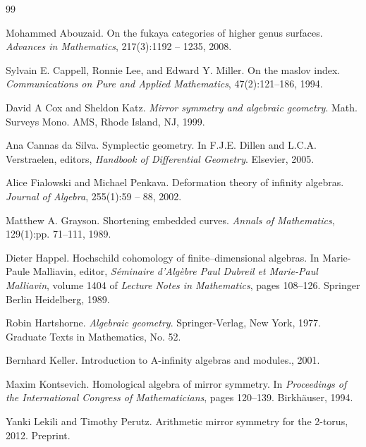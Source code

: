 
\begin{thebibliography}{99}

 Mohammed Abouzaid. On the fukaya categories of higher genus surfaces. \emph{Advances in Mathematics}, 217(3):1192 -- 1235, 2008.

 Sylvain E. Cappell, Ronnie Lee, and Edward Y. Miller. On the maslov index. \emph{Communications on Pure and Applied Mathematics}, 47(2):121--186, 1994.

 David A Cox and Sheldon Katz. \emph{Mirror symmetry and algebraic geometry}. Math. Surveys Mono. AMS, Rhode Island, NJ, 1999.

 Ana Cannas da Silva. Symplectic geometry. In F.J.E. Dillen and L.C.A. Verstraelen, editors, \emph{Handbook of Differential Geometry}. Elsevier, 2005.

 Alice Fialowski and Michael Penkava. Deformation theory of infinity algebras. \emph{Journal of Algebra}, 255(1):59 -- 88, 2002.

 Matthew A. Grayson. Shortening embedded curves. \emph{Annals of Mathematics}, 129(1):pp. 71--111, 1989.

 Dieter Happel. Hochschild cohomology of finite--dimensional algebras. In Marie-Paule Malliavin, editor, \emph{S\'eminaire d'Alg\`ebre Paul Dubreil et Marie-Paul Malliavin}, volume 1404 of \emph{Lecture Notes in Mathematics}, pages 108--126. Springer Berlin Heidelberg, 1989.

 Robin Hartshorne. \emph{Algebraic geometry}. Springer-Verlag, New York, 1977. Graduate Texts in Mathematics, No. 52.

 Bernhard Keller. Introduction to A-infinity algebras and modules., 2001.

 Maxim Kontsevich. Homological algebra of mirror symmetry. In \emph{Proceedings of the International Congress of Mathematicians}, pages 120--139. Birkh\"auser, 1994.

 Yanki Lekili and Timothy Perutz. Arithmetic mirror symmetry for the 2-torus, 2012. Preprint.


\end{thebibliography}
